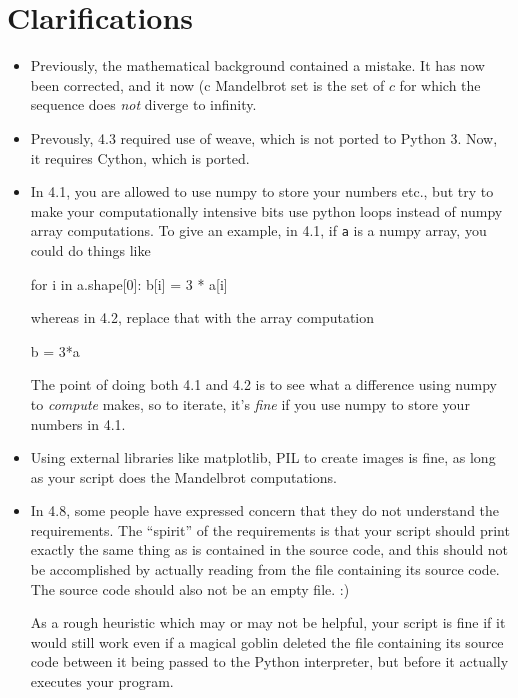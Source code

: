\documentclass[english]{article}
\begin{document}
\section{Clarifications}

\begin{itemize}
\item Previously, the mathematical background contained a mistake. It has now been corrected, and it now (c Mandelbrot set is the set of $c$ for which the sequence does \emph{not} diverge to infinity. 
\item Prevously, 4.3 required use of weave, which is not ported to Python 3. Now, it requires Cython, which is ported.
\item In 4.1, you are allowed to use numpy to store your numbers etc., but try to make your computationally intensive bits use python loops instead of numpy array computations. To give an example, in 4.1, if \texttt{a} is a numpy array, you could do things like

\begin{python}
for i in a.shape[0]:
   b[i] = 3 * a[i]
\end{python}

whereas in 4.2, replace that with the array computation

\begin{python}
b = 3*a
\end{python}



The point of doing both 4.1 and 4.2 is to see what a difference using numpy to \emph{compute} makes, so to iterate, it's \emph{fine} if you use numpy to store your numbers in 4.1.
\item Using external libraries like matplotlib, PIL to create images is fine, as long as your script does the Mandelbrot computations.

\item In 4.8, some people have expressed concern that they do not understand the requirements. The ``spirit'' of the requirements is that your script should print exactly the same thing as is contained in the source code, and this should not be accomplished by actually reading from the file containing its source code. The source code should also not be an empty file. :) 

As a rough heuristic which may or may not be helpful, your script is fine if it would still work even if a magical goblin deleted the file containing its source code between it being passed to the Python interpreter, but before it actually executes your program.
\end{itemize}
\end{document}
